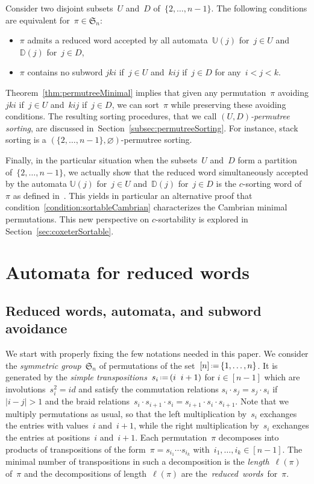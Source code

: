 \documentclass[ALCO]{cedram}
\newcommand{\fS}{\mathfrak{S}}
\newcommand{\eqdef}{\mbox{\,\raisebox{0.2ex}{\scriptsize\ensuremath{\mathrm:}}\ensuremath{=}\,}}
\newcommand{\defn}[1]{\textsl{\color{darkblue} #1}}
\newcommand{\automatonU}{\mathbb{U}}
\newcommand{\automatonD}{\mathbb{D}}
\begin{document}
\begin{theorem}\label{thm:permutreeMinimal}
Consider two disjoint subsets~$U$ and~$D$ of~$\{2, \dots, n-1\}$.
The following conditions are equivalent for~$\pi \in \fS_n$:
\begin{itemize}
	\item $\pi$ admits a reduced word accepted by all automata~$\automatonU(j)$ for~$j \in U$ and~$\automatonD(j)$ for~${j \in D}$,
	\item $\pi$ contains no subword $jki$ if~$j \in U$ and~$kij$ if~$j \in D$ for any~$i < j < k$.
\end{itemize}
\end{theorem}

Theorem~\ref{thm:permutreeMinimal} implies that given any permutation~$\pi$ avoiding $jki$ if~$j \in U$ and~$kij$ if~$j \in D$, we can sort~$\pi$ while preserving these avoiding conditions.
The resulting sorting procedures, that we call \defn{$(U,D)$-permutree sorting}, are discussed in~Section~\ref{subsec:permutreeSorting}.
For instance, stack sorting is a $(\{2, \dots, n-1\}, \varnothing)$-permutree sorting.

Finally, in the particular situation when the subsets~$U$ and~$D$ form a partition of~$\{2, \dots, n-1\}$, we actually show that the reduced word simultaneously accepted by the automata $\automatonU(j)$ for~${j \in U}$ and~$\automatonD(j)$ for~$j \in D$ is the $c$-sorting word of~$\pi$ as defined in~\cite{Reading-coxeterSortable}.
This yields in particular an alternative proof that condition~\ref{condition:sortableCambrian} characterizes the Cambrian minimal permutations.
This new perspective on $c$-sortability is explored in Section~\ref{sec:coxeterSortable}.

\section{Automata for reduced words}\label{sec:proofPatternAvoidance}

\subsection{Reduced words, automata, and subword avoidance}

We start with properly fixing the few notations needed in this paper.
We consider the \defn{symmetric group}~$\fS_n$ of permutations of the set~$[n] \eqdef \{1,\dots,n\}$.
It is generated by the \defn{simple transpositions}~$s_i \eqdef (i \;\; i+1)$ for $i \in [n-1]$ which are involutions~$s_i^2 = id$ and satisfy the commutation relations $s_i \cdot s_j =s_j \cdot s_i$ if $|i-j|>1$ and the braid relations~$s_i \cdot s_{i+1} \cdot s_i = s_{i+1} \cdot s_i \cdot s_{i+1}$.
Note that we multiply permutations as usual, so that the left multiplication by~$s_i$ exchanges the entries with values~$i$ and~$i+1$, while the right multiplication by~$s_i$ exchanges the entries at positions~$i$ and~$i+1$.
Each permutation~$\pi$ decomposes into products of transpositions of the form~$\pi = s_{i_1} \cdots s_{i_k}$ with~$i_1, \dots, i_k \in [n-1]$.
The minimal number of transpositions in such a decomposition is the \defn{length}~$\ell(\pi)$ of~$\pi$ and the decompositions of length~$\ell(\pi)$ are \mbox{the \defn{reduced words} for~$\pi$}.
\end{document}
